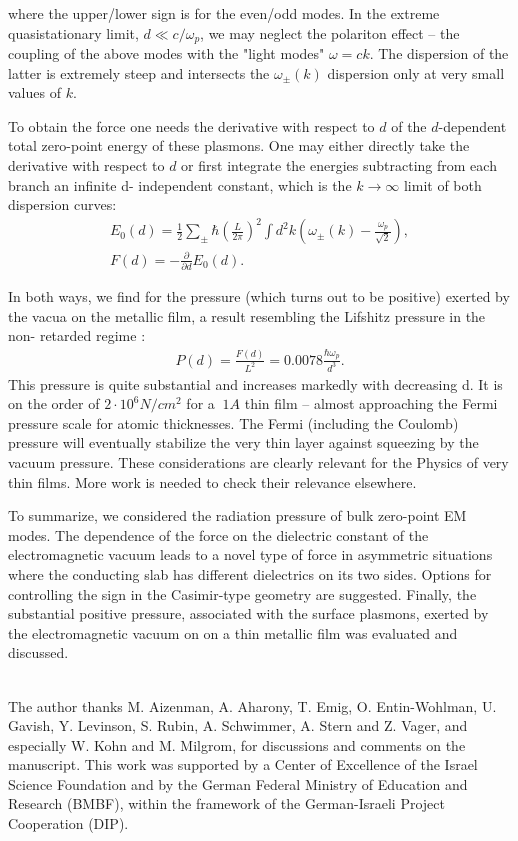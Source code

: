 \documentclass[prl,nofootinbib,twocolumn,showpacs]{revtex4}
\def\bq{\begin{eqnarray}}
\def\ee{\end{eqnarray}}
\begin{document}
\noindent where the upper/lower sign is for the even/odd modes. In the extreme
quasistationary limit, $d \ll c/\omega_p$, we may neglect the polariton effect -- the
coupling of the above modes with the "light modes" $\omega = ck$. The dispersion of the
latter is extremely steep and intersects the $\omega_{\pm}(k)$ dispersion only at very
small values of $k$.

To obtain the force one needs the derivative with respect to $d$ of the $d$-dependent
total zero-point energy of these plasmons. One may either directly take the derivative
with respect to $d$ or first integrate the energies subtracting from each branch an
infinite d- independent constant, which is the $k \rightarrow \infty$ limit of both
dispersion curves:
 \bq
 E_0(d) = \frac{1}{2} \sum_\pm \hbar (\frac{L}{2\pi})^2\int d^2 k (\omega_{\pm}(k) - \frac{\omega_p}
 {\sqrt{2}}),\\
F(d) = - \frac{\partial}{\partial d} E_0(d).
 \ee

\noindent In both ways, we find for the pressure (which turns out to be positive) exerted
by the vacua on the metallic film, a result resembling the Lifshitz pressure in the non-
retarded regime \cite{Lifshitz,Dzy}: \bq P(d) = \frac{F(d)}{L^2} = 0.0078 \frac{\hbar \omega_p}{d^3}
\label{film}. \ee  This pressure is quite substantial and increases markedly with
decreasing d. It is on the order of $2\cdot10^6 N/cm^2$ for a $~1 A$ thin film -- almost
approaching the Fermi pressure scale for atomic thicknesses. The Fermi (including the
Coulomb) pressure will eventually stabilize the very thin layer  against squeezing by the
vacuum pressure. These considerations  are clearly relevant for the Physics of very thin
films. More work is needed to check their relevance  elsewhere.

To summarize, we considered the radiation pressure of bulk zero-point EM modes. The
dependence of the force on the dielectric constant of the electromagnetic vacuum leads to
a novel type of force in asymmetric situations where the  conducting slab has different
dielectrics on its two sides.  Options for controlling the sign in the Casimir-type
geometry are suggested. Finally, the substantial positive pressure, associated with the
surface plasmons, exerted by the electromagnetic vacuum on on a thin metallic film  was
evaluated and discussed.

\vspace{0.5cm}
\\

\noindent The author thanks  M. Aizenman, A. Aharony, T. Emig, O. Entin-Wohlman, U. Gavish, Y. Levinson,  S. Rubin, A. Schwimmer, A. Stern and Z. Vager,
and especially W. Kohn and M. Milgrom, for discussions and comments on the manuscript. This work was supported by  a Center of
Excellence of the Israel Science Foundation and by the German Federal Ministry of
Education and Research (BMBF), within the framework of the German-Israeli Project
Cooperation (DIP).
\end{document}
